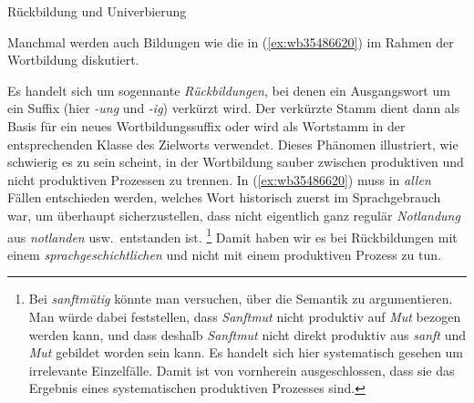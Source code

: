 

\begin{Vertiefung}{Rückbildung und Univerbierung}

\label{vert:rueckbildunguniverbierung}

\noindent Manchmal werden auch Bildungen wie die in (\ref{ex:wb35486620}) im Rahmen der Wortbildung diskutiert.

\begin{exe}
  \ex\label{ex:wb35486620} 
  \begin{xlist}
  \end{xlist}
\end{exe}

Es handelt sich um sogennante \textit{Rückbildungen}, bei denen ein Ausgangswort um ein Suffix (hier \textit{-ung} und \textit{-ig}) verkürzt wird.
Der verkürzte Stamm dient dann als Basis für ein neues Wortbildungssuffix oder wird als Wortstamm in der entsprechenden Klasse des Zielworts verwendet.
Dieses Phänomen illustriert, wie schwierig es zu sein scheint, in der Wortbildung sauber zwischen produktiven und nicht produktiven Prozessen zu trennen.
In (\ref{ex:wb35486620}) muss in \textit{allen} Fällen entschieden werden, welches Wort historisch zuerst im Sprachgebrauch war, um überhaupt sicherzustellen, dass nicht eigentlich ganz regulär \textit{Notlandung} aus \textit{notlanden} usw.\ entstanden ist.%
\footnote{Bei \textit{sanftmütig} könnte man versuchen, über die Semantik zu argumentieren.
Man würde dabei feststellen, dass \textit{Sanftmut} nicht produktiv auf \textit{Mut} bezogen werden kann, und dass deshalb \textit{Sanftmut} nicht direkt produktiv aus \textit{sanft} und \textit{Mut} gebildet worden sein kann.
Es handelt sich hier systematisch gesehen um irrelevante Einzelfälle.
Damit ist von vornherein ausgeschlossen, dass sie das Ergebnis eines systematischen produktiven Prozesses sind.}
Damit haben wir es bei Rückbildungen mit einem \textit{sprachgeschichtlichen} und nicht mit einem produktiven Prozess zu tun.


\end{Vertiefung}
